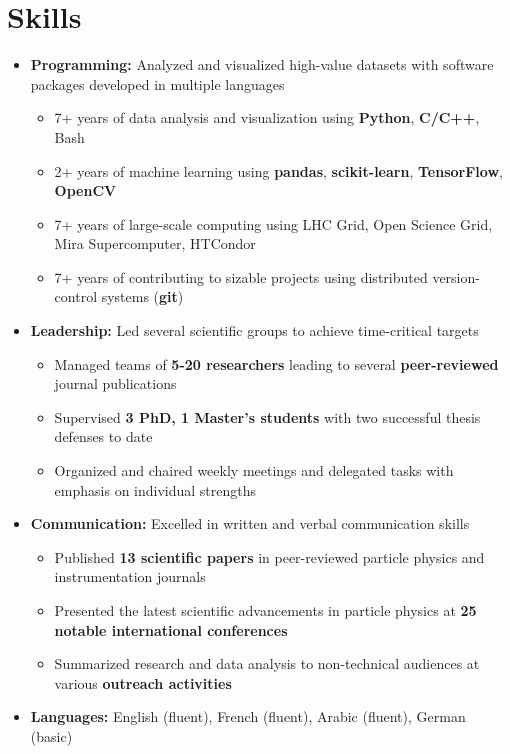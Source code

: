 \documentclass{myfancycv}
\begin{document}
\section{Skills}
\begin{itemize}

\item {\textbf{Programming:} Analyzed and visualized high-value datasets with software packages developed in multiple languages
{\begin{itemize}\setlength\itemindent{-2.2em}
\item 7+ years of data analysis and visualization using {\bf Python}, {\bf C/C++}, Bash
\item 2+ years of machine learning using {\bf pandas}, {\bf scikit-learn}, {\bf TensorFlow}, {\bf OpenCV}
\item 7+ years of large-scale computing using LHC Grid, Open Science Grid, Mira Supercomputer, HTCondor
\item 7+ years of contributing to sizable projects using distributed version-control systems ({\bf git})
\end{itemize}}%
}

\vspace{6pt}

\item {\textbf{Leadership:} Led several scientific groups to achieve time-critical targets
{\begin{itemize}\setlength\itemindent{-2.2em}
    \item Managed teams of {\bf5-20 researchers} leading to several {\bf peer-reviewed} journal publications
    \item Supervised {\bf 3 PhD, 1 Master's students} with two successful thesis defenses to date
    \item Organized and chaired weekly meetings and delegated tasks with emphasis on individual strengths


\end{itemize}}%
}

\vspace{6pt}

\item{ \textbf{Communication:} Excelled in written and verbal communication skills
{\begin{itemize}\setlength\itemindent{-2.2em}
    \item Published {\bf13 scientific papers} in peer-reviewed particle physics and instrumentation journals
    \item Presented the latest scientific advancements in particle physics at {\bf25 notable international conferences}
    \item Summarized research and data analysis to non-technical audiences at various {\bf outreach activities}

\end{itemize}}%
}

\vspace{6pt}

\item {\textbf{Languages:} English (fluent), French (fluent), Arabic (fluent), German (basic)}

\end{itemize}
\end{document}
